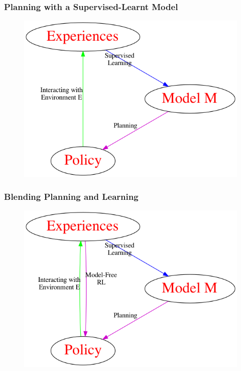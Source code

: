 \documentclass[handout]{beamer}
\begin{document}
\begin{frame}
\frametitle{Planning with a Supervised-Learnt Model}
\pause
\begin{figure}
\includegraphics[scale=0.5]{planning.png}
\end{figure}
\end{frame}

\begin{frame}
\frametitle{Blending Planning and Learning}
\pause
\begin{figure}
\includegraphics[scale=0.5]{planning_learning.png}
\end{figure}
\end{frame}
\end{document}
